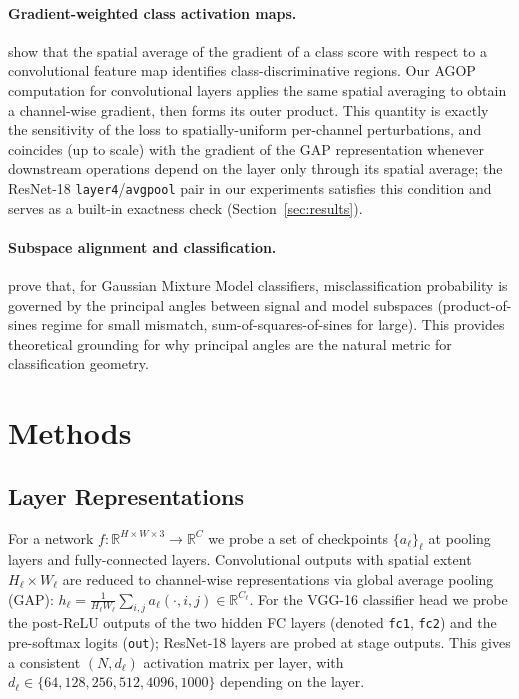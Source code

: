 \documentclass{article}
\newcommand{\R}{\mathbb{R}}
\begin{document}
\paragraph{Gradient-weighted class activation maps.}
\citet{selvaraju2017gradcam} show that the spatial average of the gradient of
a class score with respect to a convolutional feature map identifies
class-discriminative regions.  Our AGOP computation for convolutional layers
applies the same spatial averaging to obtain a channel-wise gradient, then
forms its outer product.  This quantity is exactly the sensitivity of the
loss to spatially-uniform per-channel perturbations, and coincides (up to
scale) with the gradient of the GAP representation whenever downstream
operations depend on the layer only through its spatial average; the
ResNet-18 \texttt{layer4}/\texttt{avgpool} pair in our experiments satisfies
this condition and serves as a built-in exactness check
(Section~\ref{sec:results}).

\paragraph{Subspace alignment and classification.}
\citet{huang2016principal} prove that, for Gaussian Mixture Model
classifiers, misclassification probability is governed by the principal angles
between signal and model subspaces (product-of-sines regime for small
mismatch, sum-of-squares-of-sines for large).  This provides theoretical
grounding for why principal angles are the natural metric for classification
geometry.

\section{Methods}
\label{sec:methods}

\subsection{Layer Representations}
\label{sec:reps}

For a network $f: \R^{H\times W\times 3}\to\R^C$ we probe a set of
checkpoints $\{a_\ell\}_\ell$ at pooling layers and fully-connected layers.
Convolutional outputs with spatial extent $H_\ell\times W_\ell$ are reduced to
channel-wise representations via global average pooling (GAP):
$h_\ell = \frac{1}{H_\ell W_\ell}\sum_{i,j}a_\ell(\cdot,i,j)\in\R^{C_\ell}$.
For the VGG-16 classifier head we probe the post-ReLU outputs of the two
hidden FC layers (denoted \texttt{fc1}, \texttt{fc2}) and the pre-softmax
logits (\texttt{out}); ResNet-18 layers are probed at stage outputs.
This gives a consistent $(N, d_\ell)$ activation matrix per layer, with
$d_\ell\in\{64,128,256,512,4096,1000\}$ depending on the layer.
\end{document}

